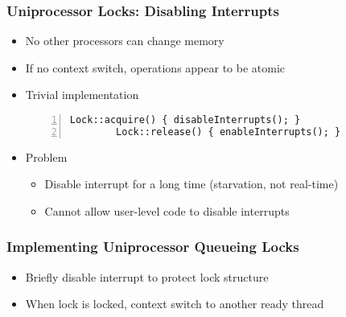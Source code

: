 \documentclass[mathserif,serif,14pt,aspectratio=169]{beamer}
\begin{document}
\begin{frame} [fragile]
	\frametitle{Uniprocessor Locks: Disabling Interrupts}
	\begin{itemize}\setlength\itemsep{0.5em}
	\item<1-> No other processors can change memory
	\item<1-> If no context switch, operations appear to be atomic
	\item<2-> Trivial implementation
		{
		\small
		\begin{lstlisting}[style=cstyle, gobble=8, frame=single, 
							numbers=left, numberstyle=\ttfamily]
		Lock::acquire() { disableInterrupts(); }
		Lock::release() { enableInterrupts(); }
		\end{lstlisting}
		}
	\item<3-> Problem
		\begin{itemize}\setlength\itemsep{0.3em}
		\item<3-> Disable interrupt for a long time (starvation, not real-time)
		\item<3-> Cannot allow user-level code to disable interrupts
		\end{itemize}
	\end{itemize}
\end{frame}

\begin{frame}
	\frametitle{Implementing Uniprocessor Queueing Locks}
	\begin{itemize}\setlength\itemsep{0.5em}
	\item<1-> Briefly disable interrupt to protect lock structure
	\item<1-> When lock is locked, context switch to another ready thread
	\end{itemize}
\end{frame}
\end{document}
